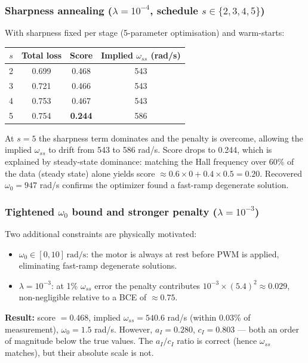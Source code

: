\documentclass[11pt,a4paper]{article}
\begin{document}
\subsubsection*{Sharpness annealing ($\lambda=10^{-4}$, schedule $s\in\{2,3,4,5\}$)}

With sharpness fixed per stage (5-parameter optimisation) and warm-starts:
\begin{center}
\begin{tabular}{cccc}
\hline
$s$ & Total loss & Score & Implied $\omega_{ss}$ (rad/s) \\ \hline
2 & 0.699 & 0.468 & 543 \\
3 & 0.721 & 0.466 & 543 \\
4 & 0.753 & 0.467 & 543 \\
5 & 0.754 & \textbf{0.244} & 586 \\ \hline
\end{tabular}
\end{center}
At $s=5$ the sharpness term dominates and the penalty is overcome, allowing
the implied $\omega_{ss}$ to drift from 543 to 586 rad/s.  Score drops to
0.244, which is explained by steady-state dominance: matching the Hall
frequency over 60\% of the data (steady state) alone yields
score $\approx 0.6 \times 0 + 0.4 \times 0.5 = 0.20$.
Recovered $\omega_0=947$ rad/s confirms the optimizer found a fast-ramp
degenerate solution.

\subsubsection*{Tightened $\omega_0$ bound and stronger penalty ($\lambda=10^{-3}$)}

Two additional constraints are physically motivated:
\begin{itemize}
  \item $\omega_0 \in [0,10]\,\text{rad/s}$: the motor is always at rest
        before PWM is applied, eliminating fast-ramp degenerate solutions.
  \item $\lambda = 10^{-3}$: at 1\% $\omega_{ss}$ error the penalty
        contributes $10^{-3}\times(5.4)^2\approx 0.029$, non-negligible
        relative to a BCE of $\approx 0.75$.
\end{itemize}

\textbf{Result:} score $=0.468$, implied $\omega_{ss}=540.6$ rad/s (within
0.03\% of measurement), $\omega_0=1.5$ rad/s.  However, $a_I=0.280$,
$c_I=0.803$ --- both an order of magnitude below the true values.  The
$a_I/c_I$ ratio is correct (hence $\omega_{ss}$ matches), but their absolute
scale is not.
\end{document}
